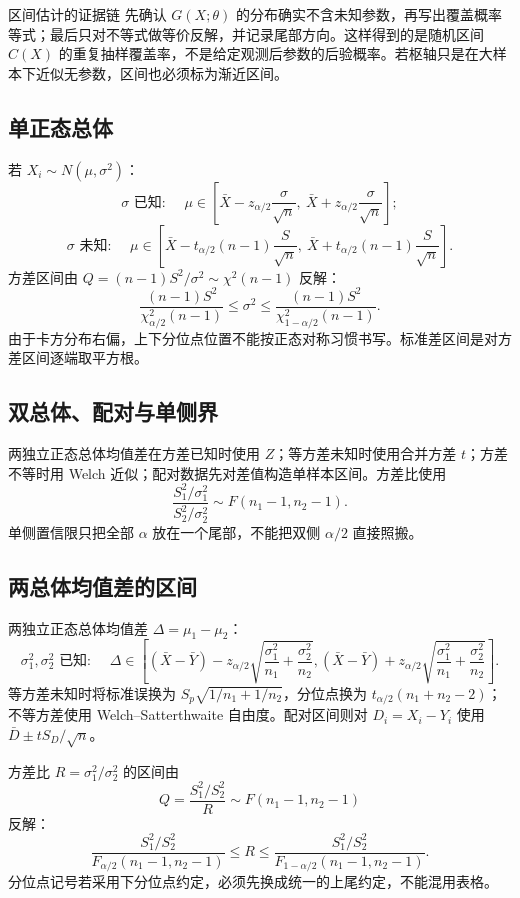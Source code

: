 \documentclass[11pt,a4paper]{ctexart}
\begin{document}
\begin{methodbox}{区间估计的证据链}
先确认 $G(X;\theta)$ 的分布确实不含未知参数，再写出覆盖概率等式；最后只对不等式做等价反解，并记录尾部方向。这样得到的是随机区间 $C(X)$ 的重复抽样覆盖率，不是给定观测后参数的后验概率。若枢轴只是在大样本下近似无参数，区间也必须标为渐近区间。
\end{methodbox}

\subsection{单正态总体}

若 $X_i\sim N(\mu,\sigma^2)$：
\[
\sigma\text{ 已知: }\quad
\mu\in\left[\bar X-z_{\alpha/2}\frac\sigma{\sqrt n},\ \bar X+z_{\alpha/2}\frac\sigma{\sqrt n}\right];
\]
\[
\sigma\text{ 未知: }\quad
\mu\in\left[\bar X-t_{\alpha/2}(n-1)\frac S{\sqrt n},\ \bar X+t_{\alpha/2}(n-1)\frac S{\sqrt n}\right].
\]
方差区间由 $Q=(n-1)S^2/\sigma^2\sim\chi^2(n-1)$ 反解：
\[
\boxed{\frac{(n-1)S^2}{\chi^2_{\alpha/2}(n-1)}\leq\sigma^2\leq\frac{(n-1)S^2}{\chi^2_{1-\alpha/2}(n-1)}}.
\]
由于卡方分布右偏，上下分位点位置不能按正态对称习惯书写。标准差区间是对方差区间逐端取平方根。

\subsection{双总体、配对与单侧界}

两独立正态总体均值差在方差已知时使用 $Z$；等方差未知时使用合并方差 $t$；方差不等时用 Welch 近似；配对数据先对差值构造单样本区间。方差比使用
\[
\frac{S_1^2/\sigma_1^2}{S_2^2/\sigma_2^2}\sim F(n_1-1,n_2-1).
\]
单侧置信限只把全部 $\alpha$ 放在一个尾部，不能把双侧 $\alpha/2$ 直接照搬。

\subsection{两总体均值差的区间}

两独立正态总体均值差 $\Delta=\mu_1-\mu_2$：
\[
\sigma_1^2,\sigma_2^2\text{ 已知: }
\quad
\Delta\in\left[(\bar X-\bar Y)-z_{\alpha/2}\sqrt{\frac{\sigma_1^2}{n_1}+\frac{\sigma_2^2}{n_2}},
(\bar X-\bar Y)+z_{\alpha/2}\sqrt{\frac{\sigma_1^2}{n_1}+\frac{\sigma_2^2}{n_2}}\right].
\]
等方差未知时将标准误换为 $S_p\sqrt{1/n_1+1/n_2}$，分位点换为 $t_{\alpha/2}(n_1+n_2-2)$；不等方差使用 Welch--Satterthwaite 自由度。配对区间则对 $D_i=X_i-Y_i$ 使用 $\bar D\pm tS_D/\sqrt n$。

方差比 $R=\sigma_1^2/\sigma_2^2$ 的区间由
\[
Q=\frac{S_1^2/S_2^2}{R}\sim F(n_1-1,n_2-1)
\]
反解：
\[
\boxed{\frac{S_1^2/S_2^2}{F_{\alpha/2}(n_1-1,n_2-1)}\le R\le
\frac{S_1^2/S_2^2}{F_{1-\alpha/2}(n_1-1,n_2-1)}}.
\]
分位点记号若采用下分位点约定，必须先换成统一的上尾约定，不能混用表格。
\end{document}
